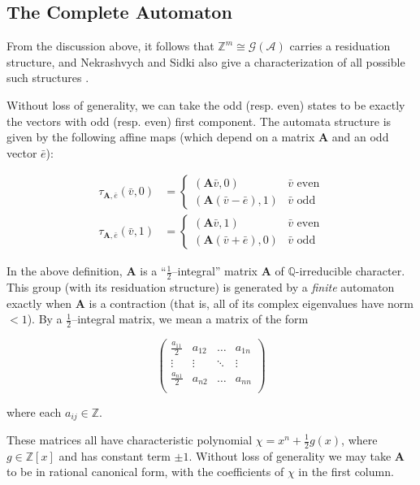 \documentclass[final]{ws-ijac}
\newcommand{\A}{\mathcal{A}}
\newcommand{\G}{\mathcal{G}}
\newcommand{\Z}{\mathbb{Z}}
\newcommand{\Q}{\mathbb{Q}}
\newcommand{\2}{\textbf{2}}
\newcommand{\Am}{\textbf{A}}
\newcommand{\vv}{\bar{v}}
\newcommand{\e}{\bar{e}}
\begin{document}
\subsection{The Complete Automaton}

From the discussion above, it follows that $\Z^m \cong \G(\A)$ carries a
residuation structure, and Nekrashvych and Sidki also give a characterization 
of all possible such structures \cite{NekrashevychSidki04:automorphisms}.

Without loss of generality, we can take the odd (resp. even) states to be 
exactly the vectors with odd (resp. even) first component. The automata 
structure is given by the following affine maps
(which depend on a matrix $\Am$ and an odd vector $\e$):

\begin{align}
  \tau_{\Am, \e}(\vv, 0) &= 
  \begin{cases} 
    (\Am \vv, 0)        & \vv \text{ even}\\
    (\Am (\vv - \e), 1) & \vv \text{ odd}
  \end{cases}
  \label{eq:1}\\
  \tau_{\Am, \e}(\vv, 1) &=
  \begin{cases} 
    (\Am \vv, 1)        & \vv \text{ even}\\
    (\Am (\vv + \e), 0) & \vv \text{ odd}
  \end{cases}
  \label{eq:2}
\end{align}

In the above definition, $\Am$ is a ``$\frac{1}{2}$--integral'' matrix $\Am$ of 
$\Q$-irreducible character. This group (with its residuation structure) is 
generated by a \emph{finite} automaton exactly when $\Am$ is a contraction 
(that is, all of its complex eigenvalues have norm $<1$). By a 
$\frac{1}{2}$--integral matrix, we mean a matrix of the form

\[
\begin{pmatrix}
  \frac{a_{11}}{2} & a_{12} & \dots  & a_{1n}\\
  \vdots           & \vdots & \ddots & \vdots\\
  \frac{a_{n1}}{2} & a_{n2} & \dots  & a_{nn}\\
\end{pmatrix}
\]

\noindent
where each $a_{ij} \in \Z$. 

These matrices all have characteristic polynomial
$\chi = x^n + \frac{1}{2}g(x)$, where $g \in \Z[x]$ and has constant term 
$\pm 1$. Without loss of generality we may take $\Am$ to be in rational 
canonical form, with the coefficients of $\chi$ in the first column.
\end{document}
